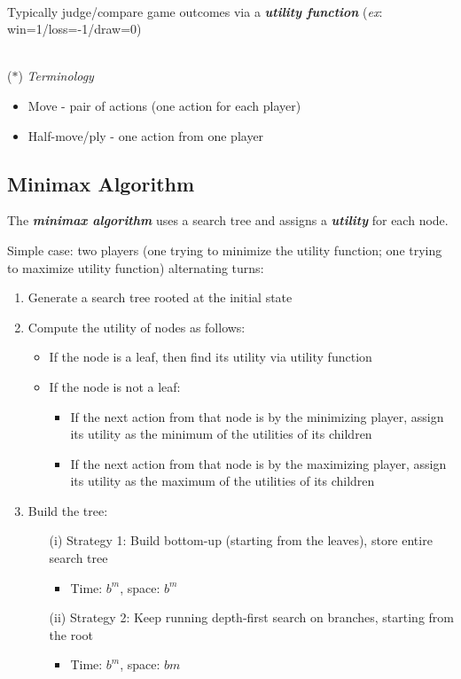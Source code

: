 \documentclass[12pt]{extarticle}
\theoremstyle{definition}
\theoremstyle{remark}
\newcommand{\pstart}[0]{\noindent}
\newcommand{\newp}[0]{~\\ \pstart}
\newcommand{\term}[1]{\noindent\textbf{\textit{#1}}}
\begin{document}
\newp
Typically judge/compare game outcomes via a \term{utility function} (\textit{ex}: win=1/loss=-1/draw=0)

\newp
($\ast$) \textit{Terminology} \begin{itemize}
    \item Move - pair of actions (one action for each player)
    \item Half-move/ply - one action from one player
\end{itemize}

\subsection{Minimax Algorithm}
\pstart
The \term{minimax algorithm} uses a search tree and assigns a \term{utility} for each node. 

\vspace{4pt}\pstart
Simple case: two players (one trying to minimize the utility function; one trying to maximize utility function) alternating turns: \begin{enumerate}
    \item Generate a search tree rooted at the initial state
    \item Compute the utility of nodes as follows: \begin{itemize}
        \item If the node is a leaf, then find its utility via utility function
        \item If the node is not a leaf: \begin{itemize}
            \item If the next action from that node is by the minimizing player, assign its utility as the minimum of the utilities of its children
            \item If the next action from that node is by the maximizing player, assign its utility as the maximum of the utilities of its children
        \end{itemize}
    \end{itemize}
    \item Build the tree: \begin{enumerate}
        \item[(i)] Strategy 1: Build bottom-up (starting from the leaves), store entire search tree \begin{itemize}
            \item Time: $b^m$, space: $b^m$
        \end{itemize}
        \item[(ii)] Strategy 2: Keep running depth-first search on branches, starting from the root \begin{itemize}
            \item Time: $b^m$, space: $bm$
        \end{itemize}
    \end{enumerate}
\end{enumerate}
\end{document}
